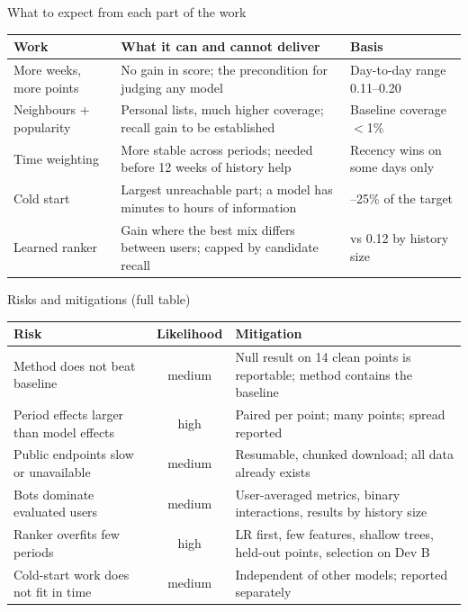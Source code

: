\documentclass[aspectratio=169,10pt]{beamer}
\newcommand{\toindex}{\hfill\hyperlink{index}{\beamerreturnbutton{index}}}
\begin{document}
\begin{frame}[label=expect]{What to expect from each part of the work \toindex}
  \small
  \renewcommand{\arraystretch}{1.3}
  \begin{tabularx}{\textwidth}{@{}>{\raggedright\arraybackslash}p{3.0cm}>{\raggedright\arraybackslash}X>{\raggedright\arraybackslash}p{4.2cm}@{}}
    \toprule
    Work & What it can and cannot deliver & Basis \\
    \midrule
    More weeks, more points & No gain in score; the precondition for judging any model & Day-to-day range 0.11--0.20 \\
    Neighbours + popularity & Personal lists, much higher coverage; recall gain to be established & Baseline coverage $<$1\% \\
    Time weighting & More stable across periods; needed before 12 weeks of history help & Recency wins on some days only \\
    Cold start & Largest unreachable part; a model has minutes to hours of information & 15--25\% of the target \\
    Learned ranker & Gain where the best mix differs between users; capped by candidate recall & 0.18 vs 0.12 by history size \\
    \bottomrule
  \end{tabularx}
\end{frame}

\begin{frame}{Risks and mitigations (full table) \toindex}
  \small
  \renewcommand{\arraystretch}{1.15}
  \begin{tabularx}{\textwidth}{@{}>{\raggedright\arraybackslash}p{4.6cm}c>{\raggedright\arraybackslash}X@{}}
    \toprule
    Risk & Likelihood & Mitigation \\
    \midrule
    Method does not beat baseline & medium & Null result on 14 clean points is reportable; method contains the baseline \\
    Period effects larger than model effects & high & Paired per point; many points; spread reported \\
    Public endpoints slow or unavailable & medium & Resumable, chunked download; all data already exists \\
    Bots dominate evaluated users & medium & User-averaged metrics, binary interactions, results by history size \\
    Ranker overfits few periods & high & LR first, few features, shallow trees, held-out points, selection on Dev B \\
    Cold-start work does not fit in time & medium & Independent of other models; reported separately \\
    \bottomrule
  \end{tabularx}
\end{frame}
\end{document}
